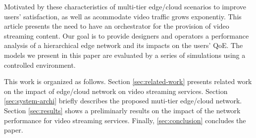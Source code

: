 Motivated by these characteristics of multi-tier edge/cloud scenarios to improve users' satisfaction, as well as acommodate video traffic grows exponentiy. This article presents the need to have an orchestrator for the provision of video streaming content.
Our goal is to provide designers and operators a performance analysis of a hierarchical edge network and its impacts on the users' QoE. The models we present in this paper are evaluated by a series of simulations using a controlled environment.

This work is organized as follows.
Section \ref{sec:related-work} presents related work on the impact of edge/cloud network on video streaming services.
Section \ref{sec:system-archi} briefly describes the proposed muti-tier edge/cloud network.
Section \ref{sec:results} shows a preliminarly results on the impact of the network performance for video streaming services.
Finally, \ref{sec:conclusion} concludes the paper.